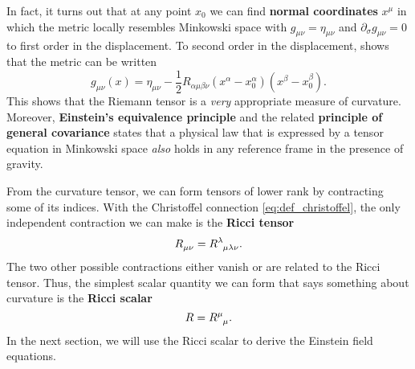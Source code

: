 In fact, it turns out that at any point $x_0$ we can find \textbf{normal coordinates} $x^\mu$ in which the metric locally resembles Minkowski space with $g_{\mu \nu} = \eta_{\mu \nu}$ and $\partial_\sigma g_{\mu \nu} = 0$ to first order in the displacement.
To second order in the displacement, \cite{ref:metric_taylor_expansion} shows that the metric can be written
\begin{equation}
	g_{\mu \nu}(x) = \eta_{\mu \nu} - \frac12 R_{\alpha \mu \beta \nu} (x^\alpha - x_0^\alpha) (x^\beta - x_0^\beta) .
\end{equation}
This shows that the Riemann tensor is a \emph{very} appropriate measure of curvature.
Moreover, \textbf{Einstein's equivalence principle} and the related \textbf{principle of general covariance} states that a physical law that is expressed by a tensor equation in Minkowski space \emph{also} holds in any reference frame in the presence of gravity. \cite[chapter 4]{ref:weinberg_gravity}


From the curvature tensor, we can form tensors of lower rank by contracting some of its indices.
With the Christoffel connection \eqref{eq:def_christoffel}, the only independent contraction we can make is the \textbf{Ricci tensor}
\begin{equation}
	R\indices{_\mu_\nu} = R\indices{^\lambda_\mu_\lambda_\nu} .
	\label{eq:def_ricci_tensor}
\end{equation}
The two other possible contractions either vanish or are related to the Ricci tensor.
Thus, the simplest scalar quantity we can form that says something about curvature is the \textbf{Ricci scalar}
\begin{equation}
	R = R\indices{^\mu_\mu} .
	\label{eq:def_ricci_scalar}
\end{equation}
In the next section, we will use the Ricci scalar to derive the Einstein field equations.



